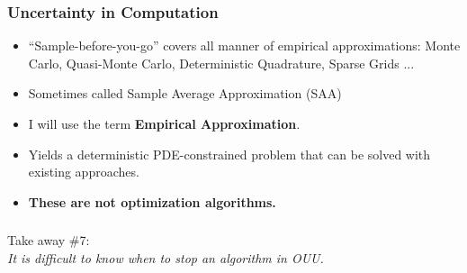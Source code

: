 \documentclass[aspectratio=169,xcolor=dvipsnames,10pt]{beamer}
\begin{document}
\begin{frame}\frametitle{Uncertainty in Computation}
\begin{exampleblock}{}
\begin{itemize}
\item ``Sample-before-you-go'' covers all manner of empirical approximations: Monte Carlo, Quasi-Monte Carlo, Deterministic Quadrature, Sparse Grids ... 
\item Sometimes called Sample Average Approximation (SAA)
\item I will use the term \textbf{Empirical Approximation}.
\item Yields a deterministic PDE-constrained problem that can be solved with existing approaches.
\item \textbf{These are not optimization algorithms.}
\end{itemize}
\end{exampleblock}
\end{frame}

\begin{frame}\frametitle{}
\begin{center}\Large
Take away \#7:\\
\textit{It is difficult to know when to stop an algorithm in OUU.}
\end{center}
\end{frame}
\end{document}

